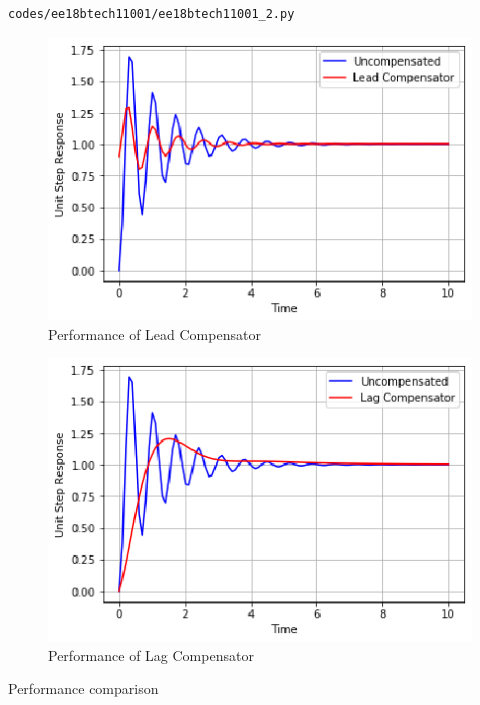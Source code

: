 \begin{lstlisting}[frame=single]
codes/ee18btech11001/ee18btech11001_2.py
\end{lstlisting}

\begin{figure}[!ht]
\centering
    \includegraphics[width=\columnwidth]{./figs/ee18btech11001/ee18btech11001_4.eps}
  \caption{Performance of Lead Compensator}
  \label{fig:ee18btech11001_fig4}
\end{figure}


\begin{figure}[!ht]
\centering
    \includegraphics[width=\columnwidth]{./figs/ee18btech11001/ee18btech11001_5.eps}
  \caption{Performance of Lag Compensator}
  \label{fig:ee18btech11001_fig5}
\end{figure}

\begin{table}[!ht]
\centering

\caption{Performance comparison}
\label{table:ee18btech11001_2}
\end{table}


